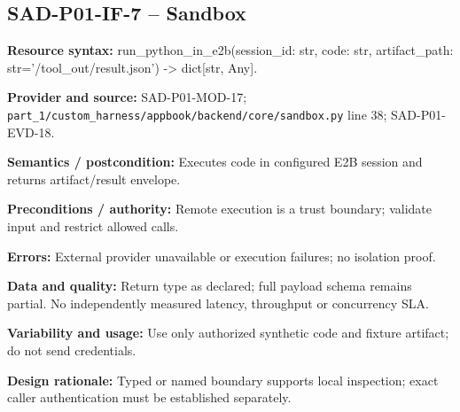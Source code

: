 \documentclass[10pt,letterpaper]{article}
\begin{document}
\subsection{SAD-P01-IF-7 -- Sandbox}
{\raggedright \textbf{Resource syntax:} run\_\allowbreak{}python\_\allowbreak{}in\_\allowbreak{}e2b(\allowbreak{}session\_\allowbreak{}id: str, code: str, artifact\_\allowbreak{}path: str='/tool\_\allowbreak{}out/result.json') -> dict[str, Any].\par}
\textbf{Provider and source:} SAD-P01-MOD-17; \nolinkurl{part_1/custom_harness/appbook/backend/core/sandbox.py} line 38; SAD-P01-EVD-18.\par
\textbf{Semantics / postcondition:} Executes code in configured E2B session and returns artifact/result envelope.\par
\textbf{Preconditions / authority:} Remote execution is a trust boundary; validate input and restrict allowed calls.\par
\textbf{Errors:} External provider unavailable or execution failures; no isolation proof.\par
\textbf{Data and quality:} Return type as declared; full payload schema remains partial. No independently measured latency, throughput or concurrency SLA.\par
\textbf{Variability and usage:} Use only authorized synthetic code and fixture artifact; do not send credentials.\par
\textbf{Design rationale:} Typed or named boundary supports local inspection; exact caller authentication must be established separately.\par
\end{document}
